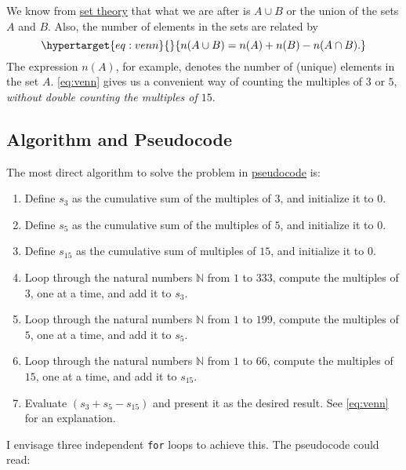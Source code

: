 \documentclass[
  a4paper,
]{article}
\begin{document}
We know from \href{https://en.wikipedia.org/wiki/Set_theory}{set theory}
that what we are after is \(A \cup B\) or the union of the sets \(A\)
and \(B\). Also, the number of elements in the sets are related by
\begin{equation}\protect\hypertarget{eq:venn}{}{
n(A \cup B) = n(A) + n(B) - n(A\cap B).
}\label{eq:venn}\end{equation} The expression \(n(A)\), for example,
denotes the number of (unique) elements in the set \(A\). \cref{eq:venn}
gives us a convenient way of counting the multiples of \(3\) or \(5\),
\emph{without double counting the multiples of \(15\)}.

\hypertarget{algorithm-and-pseudocode}{%
\subsection{Algorithm and Pseudocode}\label{algorithm-and-pseudocode}}

The most direct algorithm to solve the problem in
\href{https://en.wikipedia.org/wiki/Pseudocode}{pseudocode} is:

\begin{enumerate}
\item
  Define \(s_3\) as the cumulative sum of the multiples of \(3\), and
  initialize it to \(0\).
\item
  Define \(s_5\) as the cumulative sum of the multiples of \(5\), and
  initialize it to \(0\).
\item
  Define \(s_{15}\) as the cumulative sum of multiples of \(15\), and
  initialize it to \(0\).
\item
  Loop through the natural numbers \(\mathbb{N}\) from \(1\) to \(333\),
  compute the multiples of \(3\), one at a time, and add it to \(s_3\).
\item
  Loop through the natural numbers \(\mathbb{N}\) from \(1\) to \(199\),
  compute the multiples of \(5\), one at a time, and add it to \(s_5\).
\item
  Loop through the natural numbers \(\mathbb{N}\) from \(1\) to \(66\),
  compute the multiples of \(15\), one at a time, and add it to
  \(s_{15}\).
\item
  Evaluate \((s_3 + s_5 - s_{15})\) and present it as the desired
  result. See \cref{eq:venn} for an explanation.
\end{enumerate}

I envisage three independent \texttt{for} loops to achieve this. The
pseudocode could read:
\end{document}
